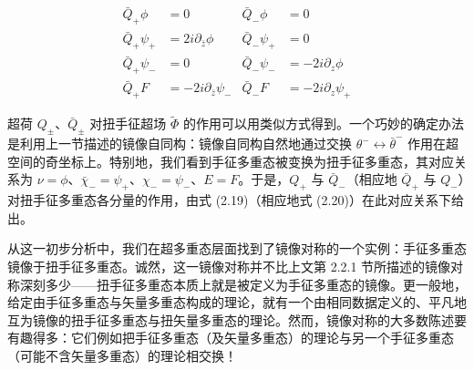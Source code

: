 \begin{equation}
\begin{aligned}
\bar Q_+\phi &= 0 & \bar Q_-\phi &= 0\\
\bar Q_+\psi_+ &= 2i\partial_{\bar z}\phi & \bar Q_-\psi_+ &= 0\\
\bar Q_+\psi_- &= 0 & \bar Q_-\psi_- &= -2i\partial_z\phi\\
\bar Q_+F &= -2i\partial_{\bar z}\psi_- & \bar Q_-F &= -2i\partial_z\psi_+
\end{aligned}\tag{2.20}
\end{equation}

超荷 $Q_\pm$、$\bar Q_\pm$ 对扭手征超场 $\tilde\Phi$ 的作用可以用类似方式得到。一个巧妙的确定办法是利用上一节描述的镜像自同构：镜像自同构自然地通过交换 $\theta^-\leftrightarrow\bar\theta^-$ 作用在超空间的奇坐标上。特别地，我们看到手征多重态被变换为扭手征多重态，其对应关系为 $\nu=\phi$、$\bar\chi_-=\psi_+$、$\chi_-=\psi_-$、$E=F$。于是，$Q_+$ 与 $\bar Q_-$（相应地 $\bar Q_+$ 与 $Q_-$）对扭手征多重态各分量的作用，由式 (2.19)（相应地式 (2.20)）在此对应关系下给出。

从这一初步分析中，我们在超多重态层面找到了镜像对称的一个实例：手征多重态镜像于扭手征多重态。诚然，这一镜像对称并不比上文第 2.2.1 节所描述的镜像对称深刻多少——扭手征多重态本质上就是被定义为手征多重态的镜像。更一般地，给定由手征多重态与矢量多重态构成的理论，就有一个由相同数据定义的、平凡地互为镜像的扭手征多重态与扭矢量多重态的理论。然而，镜像对称的大多数陈述要有趣得多：它们例如把手征多重态（及矢量多重态）的理论与另一个手征多重态（可能不含矢量多重态）的理论相交换！
